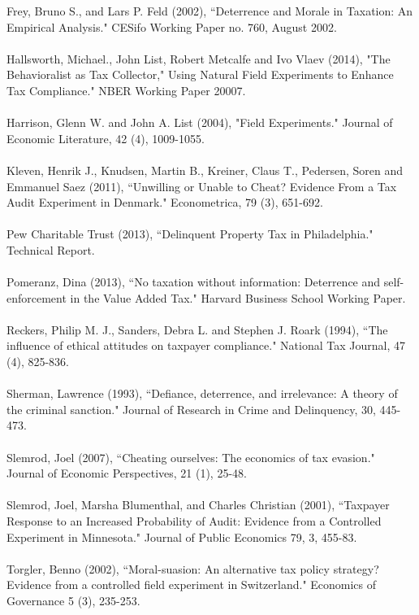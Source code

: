 \documentclass[12pt,titlepage]{article}
\begin{document}
Frey, Bruno S., and Lars P. Feld (2002),  ``Deterrence and Morale in Taxation: An
Empirical Analysis." CESifo Working Paper no. 760, August 2002. \\
\\
Hallsworth, Michael., John List, Robert Metcalfe and Ivo Vlaev (2014), "The Behavioralist as Tax Collector,"
Using Natural Field Experiments to Enhance Tax Compliance." NBER Working Paper 20007. \\
\\
Harrison, Glenn W. and John A. List (2004), "Field Experiments." Journal of Economic Literature, 42 (4),
1009-1055.\\ 
\\
Kleven, Henrik J., Knudsen, Martin B., Kreiner, Claus T., Pedersen, Soren and Emmanuel Saez (2011),
``Unwilling or Unable to Cheat? Evidence From a Tax Audit Experiment in Denmark."
Econometrica, 79 (3), 651-692. \\
\\
Pew Charitable Trust (2013), ``Delinquent Property Tax in Philadelphia." Technical Report. \\
\\
Pomeranz, Dina (2013), ``No taxation without information: Deterrence and self-enforcement in the Value
Added Tax." Harvard Business School Working Paper. \\
\\
Reckers, Philip M. J., Sanders, Debra L. and Stephen J. Roark (1994), ``The influence of ethical attitudes on
taxpayer compliance." National Tax Journal, 47 (4), 825-836. \\
\\
Sherman, Lawrence (1993), ``Defiance, deterrence, and irrelevance: A theory of the criminal sanction."
Journal of Research in Crime and Delinquency, 30,  445-473. \\
\\ 
Slemrod, Joel (2007), ``Cheating ourselves: The economics of tax evasion." Journal of Economic
Perspectives, 21 (1), 25-48. \\
\\
Slemrod, Joel, Marsha Blumenthal, and Charles Christian (2001), ``Taxpayer Response to an Increased Probability of Audit: Evidence from a Controlled Experiment in Minnesota." Journal of Public Economics 79, 3, 455-83.\\
\\
Torgler, Benno (2002), ``Moral-suasion: An alternative tax policy strategy? Evidence from a controlled field
experiment in Switzerland." Economics of Governance 5 (3), 235-253. \\
\end{document}
